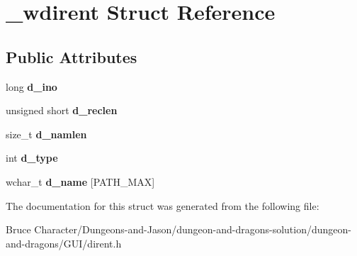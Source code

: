 \hypertarget{struct__wdirent}{}\section{\+\_\+wdirent Struct Reference}
\label{struct__wdirent}
\subsection*{Public Attributes}
\begin{DoxyCompactItemize}
\item 
\hypertarget{struct__wdirent_ac8cfaf294a0b6a49287d3f384c280c93}{}\label{struct__wdirent_ac8cfaf294a0b6a49287d3f384c280c93} 
long {\bfseries d\+\_\+ino}
\item 
\hypertarget{struct__wdirent_aff7f360608e576cd18cf11f2caf13ef3}{}\label{struct__wdirent_aff7f360608e576cd18cf11f2caf13ef3} 
unsigned short {\bfseries d\+\_\+reclen}
\item 
\hypertarget{struct__wdirent_a0050d6131e6fa90206903e216b38799e}{}\label{struct__wdirent_a0050d6131e6fa90206903e216b38799e} 
size\+\_\+t {\bfseries d\+\_\+namlen}
\item 
\hypertarget{struct__wdirent_a3c3874604ffccbeeaffd96709763cc3b}{}\label{struct__wdirent_a3c3874604ffccbeeaffd96709763cc3b} 
int {\bfseries d\+\_\+type}
\item 
\hypertarget{struct__wdirent_a267f915cd36cad5969337a9192cab567}{}\label{struct__wdirent_a267f915cd36cad5969337a9192cab567} 
wchar\+\_\+t {\bfseries d\+\_\+name} \mbox{[}P\+A\+T\+H\+\_\+\+M\+AX\mbox{]}
\end{DoxyCompactItemize}


The documentation for this struct was generated from the following file\+:\begin{DoxyCompactItemize}
\item 
Bruce Character/\+Dungeons-\/and-\/\+Jason/dungeon-\/and-\/dragons-\/solution/dungeon-\/and-\/dragons/\+G\+U\+I/dirent.\+h\end{DoxyCompactItemize}
